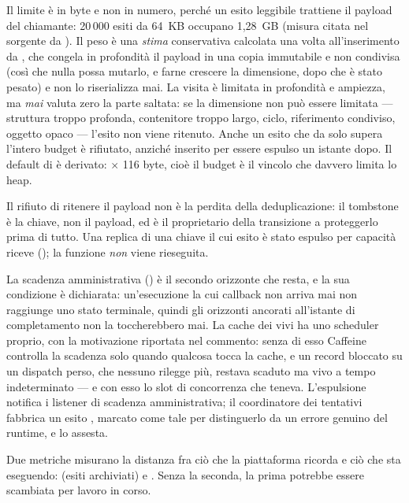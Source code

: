 Il limite \`e in byte e non in numero, perch\'e un esito leggibile trattiene il
payload del chiamante: 20\,000 esiti da 64~KB occupano 1,28~GB (misura citata nel
sorgente da ).
Il peso \`e una \emph{stima} conservativa calcolata una volta all'inserimento da
, che congela in profondit\`a il payload in una copia
immutabile e non condivisa (cos\`i che nulla possa mutarlo, e farne crescere la
dimensione, dopo che \`e stato pesato) e non lo riserializza mai. La visita \`e
limitata in profondit\`a e ampiezza, ma \emph{mai} valuta zero la parte saltata:
se la dimensione non pu\`o essere limitata --- struttura troppo profonda,
contenitore troppo largo, ciclo, riferimento condiviso, oggetto opaco --- l'esito
non viene ritenuto. Anche un esito che da solo supera l'intero budget \`e
rifiutato, anzich\'e inserito per essere espulso un istante dopo. Il default di
 \`e derivato:  $\times$ 116 byte, cio\`e
il budget \`e il vincolo che davvero limita lo heap.

Il rifiuto di ritenere il payload non \`e la perdita della deduplicazione: il
tombstone \`e la chiave, non il payload, ed \`e il proprietario della transizione
a proteggerlo prima di tutto. Una replica di una chiave il cui esito \`e stato
espulso per capacit\`a riceve  (); la
funzione \emph{non} viene rieseguita.

La scadenza amministrativa () \`e il secondo orizzonte che
resta, e la sua condizione \`e dichiarata: un'esecuzione la cui callback non
arriva mai non raggiunge uno stato terminale, quindi gli orizzonti ancorati
all'istante di completamento non la toccherebbero mai. La cache dei vivi ha uno
scheduler proprio, con la motivazione riportata nel commento: senza di esso
Caffeine controlla la scadenza solo quando qualcosa tocca la cache, e un record
bloccato su un dispatch perso, che nessuno rilegge pi\`u, restava scaduto ma vivo
a tempo indeterminato --- e con esso lo slot di concorrenza che teneva.
L'espulsione notifica i listener di scadenza amministrativa; il coordinatore dei
tentativi fabbrica un esito , marcato come tale per
distinguerlo da un errore genuino del runtime, e lo assesta.

Due metriche misurano la distanza fra ci\`o che la piattaforma ricorda e ci\`o che
sta eseguendo:  (esiti archiviati) e
. Senza la seconda, la prima potrebbe essere
scambiata per lavoro in corso.

